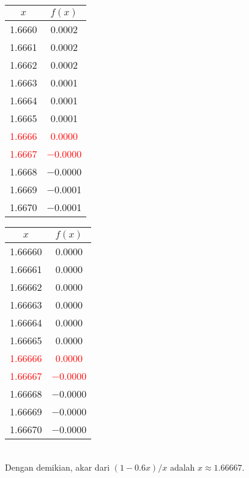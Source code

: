 \documentclass{article}
\begin{document}
\begin{enumerate}
\begin{enumerate}
            \begin{tabular}{|c|c|}
            \hline
            $x$   & $f(x)$ \\
            \hline
            \num{1,6660} & \num{0,0002} \\
            \num{1,6661} & \num{0,0002} \\
            \num{1,6662} & \num{0,0002} \\
            \num{1,6663} & \num{0,0001} \\
            \num{1,6664} & \num{0,0001} \\
            \num{1,6665} & \num{0,0001} \\
            \textcolor{red}{\num{1,6666}} & \textcolor{red}{\num{0,0000}} \\
            \textcolor{red}{\num{1,6667}} & \textcolor{red}{\num{-0,0000}} \\
            \num{1,6668} & \num{-0,0000} \\
            \num{1,6669} & \num{-0,0001} \\
            \num{1,6670} & \num{-0,0001} \\
            \hline
            \end{tabular}\quad
            \begin{tabular}{|c|c|}
            \hline
            $x$   & $f(x)$ \\
            \hline
            \num{1,66660} & \num{0,0000} \\
            \num{1,66661} & \num{0,0000} \\
            \num{1,66662} & \num{0,0000} \\
            \num{1,66663} & \num{0,0000} \\
            \num{1,66664} & \num{0,0000} \\
            \num{1,66665} & \num{0,0000} \\
            \textcolor{red}{\num{1,66666}} & \textcolor{red}{\num{0,0000}} \\
            \textcolor{red}{\num{1,66667}} & \textcolor{red}{\num{-0,0000}} \\
            \num{1,66668} & \num{-0,0000} \\
            \num{1,66669} & \num{-0,0000} \\
            \num{1,66670} & \num{-0,0000} \\
            \hline
            \end{tabular}\quad \\ 
    
        Dengan demikian, akar dari $(1 - \num{0,6}x) / x$ adalah $x \approx \num{1,66667}$.
    
    \end{enumerate}
\end{enumerate}
\end{document}
